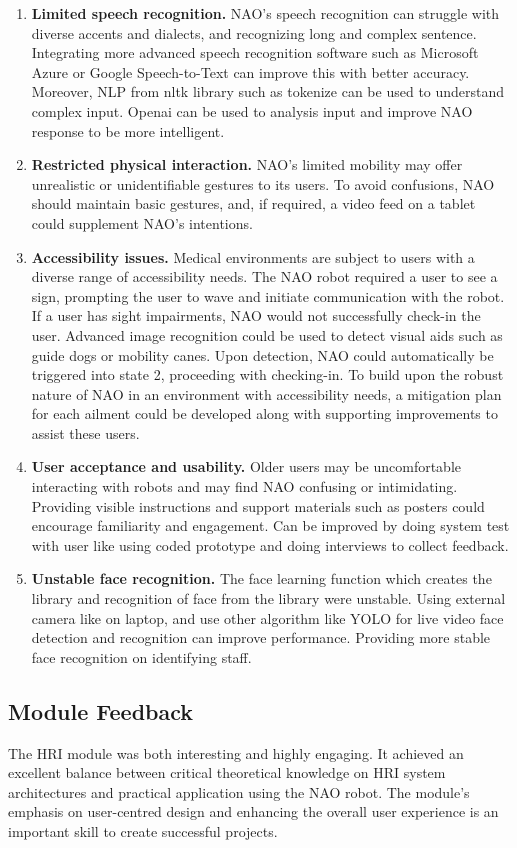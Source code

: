 \documentclass[conference]{IEEEtran}
\begin{document}
\begin{enumerate} 
        \item \textbf{Limited speech recognition.} NAO’s speech recognition can struggle with diverse accents and dialects, and recognizing long and complex sentence. Integrating more advanced speech recognition software such as Microsoft Azure or Google Speech-to-Text can improve this with better accuracy. Moreover, NLP from nltk library such as tokenize can be used to understand complex input. Openai can be used to analysis input and improve NAO response to be more intelligent.
        \item \textbf{Restricted physical interaction.} NAO’s limited mobility may offer unrealistic or unidentifiable gestures to its users. To avoid confusions, NAO should maintain basic gestures, and, if required, a video feed on a tablet could supplement NAO’s intentions.
        \item \textbf{Accessibility issues.} Medical environments are subject to users with a diverse range of accessibility needs. The NAO robot required a user to see a sign, prompting the user to wave and initiate communication with the robot. If a user has sight impairments, NAO would not successfully check-in the user.  Advanced image recognition could be used to detect visual aids such as guide dogs or mobility canes. Upon detection, NAO could automatically be triggered into state 2, proceeding with checking-in. To build upon the robust nature of NAO in an environment with accessibility needs, a mitigation plan for each ailment could be developed along with supporting improvements to assist these users.
        \item \textbf{User acceptance and usability.} Older users may be uncomfortable interacting with robots and may find NAO confusing or intimidating. Providing visible instructions and support materials such as posters could encourage familiarity and engagement. Can be improved by doing system test with user like using coded prototype and doing interviews to collect feedback.
        \item \textbf{Unstable face recognition.} The face learning function which creates the library and recognition of face from the library were unstable. Using external camera like on laptop, and use other algorithm like YOLO for live video face detection and recognition can improve performance. Providing more stable face recognition on identifying staff. 
\end{enumerate}


\subsection{Module Feedback} The HRI module was both interesting and highly engaging. It achieved an excellent balance between critical theoretical knowledge on HRI system architectures and practical application using the NAO robot. The module’s emphasis on user-centred design and enhancing the overall user experience is an important skill to create successful projects.
\end{document}
